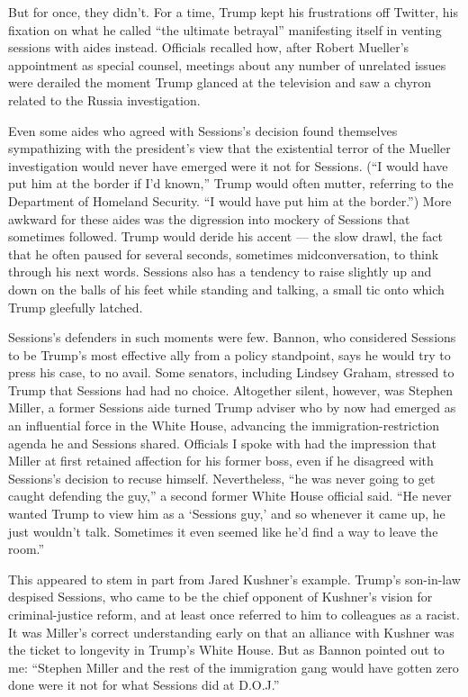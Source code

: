 But for once, they didn't. For a time, Trump kept his frustrations off
Twitter, his fixation on what he called ``the ultimate betrayal''
manifesting itself in venting sessions with aides instead. Officials
recalled how, after Robert Mueller's appointment as special counsel,
meetings about any number of unrelated issues were derailed the moment
Trump glanced at the television and saw a chyron related to the Russia
investigation.

Even some aides who agreed with Sessions's decision found themselves
sympathizing with the president's view that the existential terror of
the Mueller investigation would never have emerged were it not for
Sessions. (``I would have put him at the border if I'd known,'' Trump
would often mutter, referring to the Department of Homeland Security.
``I would have put him at the border.'') More awkward for these aides
was the digression into mockery of Sessions that sometimes followed.
Trump would deride his accent --- the slow drawl, the fact that he often
paused for several seconds, sometimes midconversation, to think through
his next words. Sessions also has a tendency to raise slightly up and
down on the balls of his feet while standing and talking, a small tic
onto which Trump gleefully latched.

Sessions's defenders in such moments were few. Bannon, who considered
Sessions to be Trump's most effective ally from a policy standpoint,
says he would try to press his case, to no avail. Some senators,
including Lindsey Graham, stressed to Trump that Sessions had had no
choice. Altogether silent, however, was Stephen Miller, a former
Sessions aide turned Trump adviser who by now had emerged as an
influential force in the White House, advancing the
immigration-restriction agenda he and Sessions shared. Officials I spoke
with had the impression that Miller at first retained affection for his
former boss, even if he disagreed with Sessions's decision to recuse
himself. Nevertheless, ``he was never going to get caught defending the
guy,'' a second former White House official said. ``He never wanted
Trump to view him as a `Sessions guy,' and so whenever it came up, he
just wouldn't talk. Sometimes it even seemed like he'd find a way to
leave the room.''

This appeared to stem in part from Jared Kushner's example. Trump's
son-in-law despised Sessions, who came to be the chief opponent of
Kushner's vision for criminal-justice reform, and at least once referred
to him to colleagues as a racist. It was Miller's correct understanding
early on that an alliance with Kushner was the ticket to longevity in
Trump's White House. But as Bannon pointed out to me: ``Stephen Miller
and the rest of the immigration gang would have gotten zero done were it
not for what Sessions did at D.O.J.''


